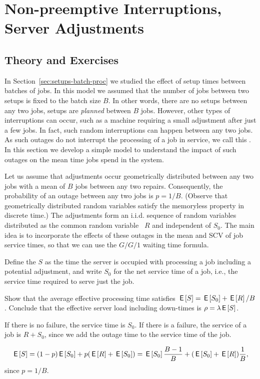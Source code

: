 \section{Non-preemptive Interruptions, Server Adjustments}
\label{sec:non-preempt-interr}

\subsection*{Theory and Exercises}




In Section~\ref{sec:setups-batch-proc} we studied the effect of setup times between batches of jobs.
In this model we assumed that the number of jobs between two setups is fixed to the batch size $B$.
In other words, there are no setups between any two jobs, setups are \emph{planned} between $B$ jobs.
However, other types of interruptions can occur, such as a machine requiring a small adjustment after just a few jobs.
In fact, such random interruptions can happen between any two jobs.
As such outages do not interrupt the processing of a job in service,  we call this .
In this section we develop a simple model to understand the impact of such outages on the mean time jobs spend in the system.

Let us assume that adjustments occur geometrically distributed between any two jobs with a mean of $B$ jobs between any two repairs.
Consequently, the probability of an outage between any two jobs is $p=1/B$.
(Observe that geometrically distributed random variables satisfy the memoryless property in discrete time.)
The adjustments form an i.i.d.
sequence of random variables distributed as the common random variable ~$R$ and independent of $S_0$.
The main idea is to incorporate the effects of these outages in the mean and SCV of job service times, so that we can use the $G/G/1$ waiting time formula.

Define the  $S$ as the time the server is occupied with processing a job including a potential adjustment, and write $S_0$ for the net service time of a job, i.e., the service time required to serve just the job.

\begin{exercise}[\faCalculator]
  Show that the average effective processing time satisfies $ \,\mathsf{E}\left[S\right] = \,\mathsf{E}\left[S_0\right] + \,\mathsf{E}\left[R\right]/B$. Conclude that the effective server load including down-times is $\rho = \lambda \,\mathsf{E}\left[S\right]$. 
\begin{hint}
If there is no failure, the service time is $S_0$. If there is a failure, the service of a job is $R + S_0$, since we add the outage time to the service time of the job. 
\end{hint}
  \begin{solution}
    \begin{equation*}
      \,\mathsf{E}\left[S\right] = (1-p)\,\mathsf{E}\left[S_0\right] + p (\,\mathsf{E}\left[R\right] + \,\mathsf{E}\left[S_0\right]) = \,\mathsf{E}\left[S_0\right] \frac{B-1}B + (\,\mathsf{E}\left[S_0\right] + \,\mathsf{E}\left[R\right]) \frac 1B,
    \end{equation*}
since $p=1/B$. 
  \end{solution}
\end{exercise}

